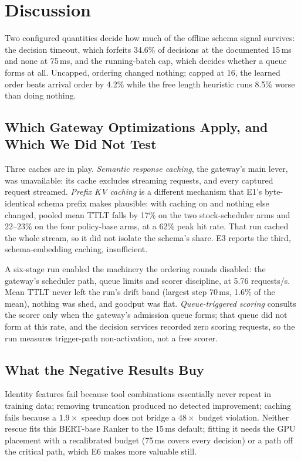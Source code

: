 \section{Discussion}

Two configured quantities decide how much of the offline schema signal
survives: the decision timeout, which forfeits 34.6\% of decisions at the
documented 15\,ms and none at 75\,ms, and the running-batch cap, which
decides whether a queue forms at all. Uncapped, ordering changed nothing; capped at 16, the learned order
beats arrival order by 4.2\% while the free length heuristic runs 8.5\%
worse than doing nothing.

\subsection{Which Gateway Optimizations Apply, and Which We Did Not Test}
Three caches are in play. \emph{Semantic response caching}, the gateway's
main lever, was unavailable: its cache excludes streaming requests, and
every captured request streamed. \emph{Prefix KV caching} is a
different mechanism that E1's byte-identical schema prefix makes plausible:
with caching on and nothing else changed, pooled mean TTLT falls by 17\% on
the two stock-scheduler arms and 22--23\% on the four policy-base arms, at a
62\% peak hit rate. That run cached the whole stream, so it did not isolate
the schema's share. E3 reports the third, schema-embedding caching,
insufficient.

A six-stage run enabled the machinery the ordering rounds disabled: the
gateway's scheduler path, queue limits and scorer discipline, at 5.76
requests/s. Mean TTLT never left the run's drift band (largest step 70\,ms,
1.6\% of the mean), nothing was shed, and goodput was flat. \emph{Queue-triggered scoring} consults the scorer only when the
gateway's admission queue forms; that queue did not form at this rate, and
the decision services
recorded zero scoring requests, so the run measures trigger-path
non-activation, not a free scorer.

\subsection{What the Negative Results Buy}
Identity features fail because tool combinations essentially never repeat in
training data; removing truncation produced no detected improvement; caching
fails because a $1.9\times$
speedup does not bridge a $48\times$ budget violation. Neither rescue fits
this BERT-base Ranker to the 15\,ms default; fitting it needs the GPU
placement with a recalibrated budget (75\,ms covers every decision) or a
path off the critical path, which E6 makes more valuable still.

